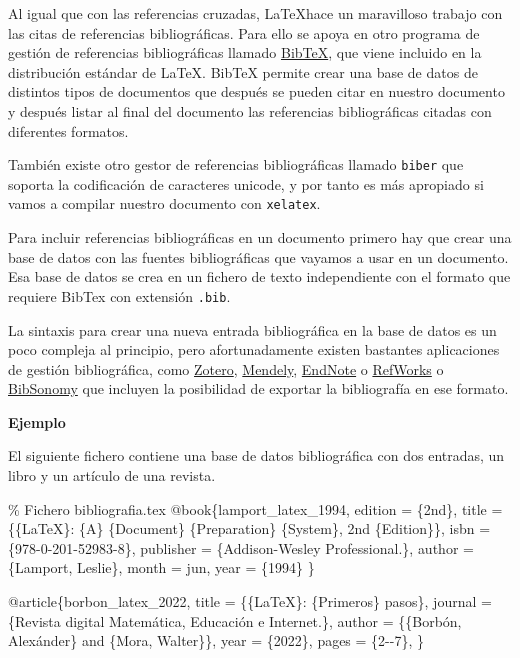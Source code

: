 \documentclass[
  letterpaper,
  DIV=11,
  numbers=noendperiod]{scrreport}
\newenvironment{Shaded}{\begin{snugshade}}{\end{snugshade}}
\newcommand{\CommentTok}[1]{\textcolor[rgb]{0.37,0.37,0.37}{#1}}
\newcommand{\NormalTok}[1]{\textcolor[rgb]{0.00,0.23,0.31}{#1}}
\begin{document}
Al igual que con las referencias cruzadas, \LaTeX hace un
maravilloso trabajo con las citas de referencias bibliográficas. Para
ello se apoya en otro programa de gestión de referencias bibliográficas
llamado \href{http://www.bibtex.org/}{BibTeX}, que viene incluido en la
distribución estándar de \LaTeX. BibTeX permite crear una base de
datos de distintos tipos de documentos que después se pueden citar en
nuestro documento y después listar al final del documento las
referencias bibliográficas citadas con diferentes formatos.

También existe otro gestor de referencias bibliográficas llamado
\texttt{biber} que soporta la codificación de caracteres unicode, y por
tanto es más apropiado si vamos a compilar nuestro documento con
\texttt{xelatex}.

Para incluir referencias bibliográficas en un documento primero hay que
crear una base de datos con las fuentes bibliográficas que vayamos a
usar en un documento. Esa base de datos se crea en un fichero de texto
independiente con el formato que requiere BibTex con extensión
\texttt{.bib}.

La sintaxis para crear una nueva entrada bibliográfica en la base de
datos es un poco compleja al principio, pero afortunadamente existen
bastantes aplicaciones de gestión bibliográfica, como
\href{https://www.zotero.org/}{Zotero},
\href{https://www.mendeley.com/}{Mendely},
\href{https://endnote.com/}{EndNote} o
\href{https://refworks.proquest.com/researcher/}{RefWorks} o
\href{https://www.bibsonomy.org/}{BibSonomy} que incluyen la posibilidad
de exportar la bibliografía en ese formato.

\textbf{Ejemplo}

El siguiente fichero contiene una base de datos bibliográfica con dos
entradas, un libro y un artículo de una revista.

\begin{Shaded}
\begin{Highlighting}[]
\CommentTok{\% Fichero bibliografia.tex}
\NormalTok{@book\{lamport\_latex\_1994,}
\NormalTok{    edition = \{2nd\},}
\NormalTok{    title = \{\{LaTeX\}: \{A\} \{Document\} \{Preparation\} \{System\}, 2nd \{Edition\}\},}
\NormalTok{    isbn = \{978{-}0{-}201{-}52983{-}8\},}
\NormalTok{    publisher = \{Addison{-}Wesley Professional.\},}
\NormalTok{    author = \{Lamport, Leslie\},}
\NormalTok{    month = jun,}
\NormalTok{    year = \{1994\}}
\NormalTok{\}}

\NormalTok{@article\{borbon\_latex\_2022,}
\NormalTok{    title = \{\{LaTeX\}: \{Primeros\} pasos\},}
\NormalTok{    journal = \{Revista digital Matemática, Educación e Internet.\},}
\NormalTok{    author = \{\{Borbón, Alexánder\} and \{Mora, Walter\}\},}
\NormalTok{    year = \{2022\},}
\NormalTok{    pages = \{2{-}{-}7\},}
\NormalTok{\}}
\end{Highlighting}
\end{Shaded}
\end{document}
